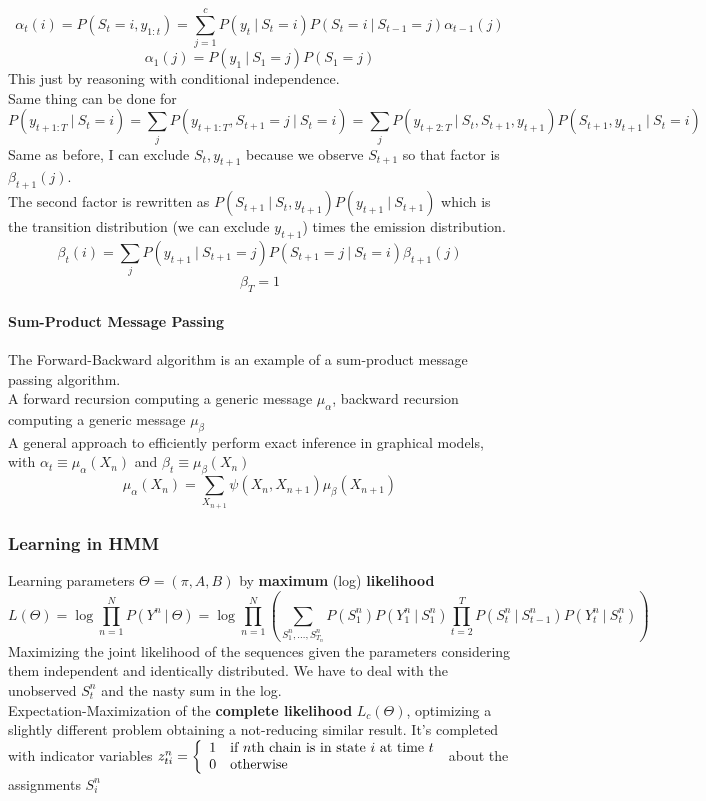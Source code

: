 \documentclass[10pt]{report}
\begin{document}
$$\alpha_t(i) = P(S_t=i,y_{1:t}) = \sum_{j=1}^c P(y_t\:|\:S_t=i) P(S_t=i\:|\:S_{t-1}=j)\alpha_{t-1}(j)$$
$$\alpha_1(j) = P(y_1\:|\:S_1=j)P(S_1=j)$$
This just by reasoning with conditional independence.\\
Same thing can be done for $$P(y_{t+1:T}\:|\:S_{t} = i) = \sum_j P(y_{t+1:T},S_{t+1}=j\:|\:S_t=i) = \sum_j P(y_{t+2:T}\:|\:S_t, S_{t+1},y_{t+1})P(S_{t+1},y_{t+1}\:|\:S_t=i)$$
Same as before, I can exclude $S_t, y_{t+1}$ because we observe $S_{t+1}$ so that factor is $\beta_{t+1}(j)$.\\
The second factor is rewritten as $P(S_{t+1}\:|\:S_t,y_{t+1})P(y_{t+1}\:|\:S_{t+1})$ which is the transition distribution (we can exclude $y_{t+1}$) times the emission distribution.
$$\beta_t(i) = \sum_j P(y_{t+1}\:|\:S_{t+1} = j)P(S_{t+1}=j\:|\:S_t=i)\beta_{t+1}(j)$$ %
$$\beta_T = 1$$
\paragraph{Sum-Product Message Passing} The Forward-Backward algorithm is an example of a sum-product message passing algorithm.\\
A forward recursion computing a generic message $\mu_\alpha$, backward recursion computing a generic message $\mu_\beta$\\
A general approach to efficiently perform exact inference in graphical models, with $\alpha_t \equiv \mu_\alpha(X_n)$ and $\beta_{t}\equiv \mu_\beta(X_n)$
$$\mu_\alpha(X_n) = \sum_{X_{n+1}} \psi(X_n, X_{n+1})\mu_\beta(X_{n+1})$$
\subsubsection{Learning in HMM}
Learning parameters $\Theta=(\pi,A,B)$ by \textbf{maximum} (log) \textbf{likelihood}
$$L(\Theta) = \log\prod_{n=1}^N P(Y^n\:|\:\Theta) = \log\prod_{n=1}^N\left(\sum_{S_1^n,\ldots,S_{T_n}^n} P(S_1^n)P(Y_1^n\:|\:S_1^n)\prod_{t=2}^T P(S_t^n\:|\:S_{t-1}^n)P(Y_t^n\:|\:S_t^n)\right)$$
Maximizing the joint likelihood of the sequences given the parameters considering them independent and identically distributed. We have to deal with the unobserved $S_t^n$ and the nasty sum in the log.\\
Expectation-Maximization of the \textbf{complete likelihood} $L_c(\Theta)$, optimizing a slightly different problem obtaining a not-reducing similar result. It's completed with indicator variables $z_{ti}^n=\left\{\begin{array}{c l}
1&\text{if }n\text{th chain is in state }i\text{ at time }t\\
0&\text{otherwise}
\end{array}\right.$ about the assignments $S_i^n$
\end{document}
